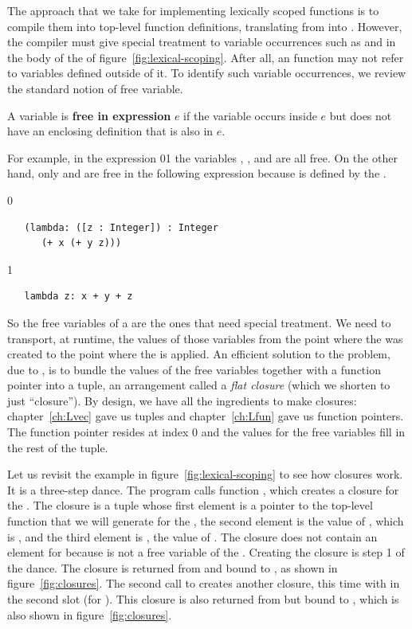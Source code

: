 \documentclass[7x10]{TimesAPriori_MIT}%
\def\racketEd{0}
\def\pythonEd{1}
\def\edition{0}
\newcommand{\racket}[1]{{\if\edition\racketEd{#1}\fi}}
\newcommand{\python}[1]{{\if\edition\pythonEd #1\fi}}
\numberwithin{theorem}{chapter}
\numberwithin{definition}{chapter}
\numberwithin{equation}{chapter}
\begin{document}
The approach that we take for implementing lexically scoped functions
is to compile them into top-level function definitions, translating
from \LangLam{} into \LangFun{}.  However, the compiler must give
special treatment to variable occurrences such as  and
 in the body of the  of
figure~\ref{fig:lexical-scoping}. After all, an \LangFun{} function
may not refer to variables defined outside of it. To identify such
variable occurrences, we review the standard notion of free variable.

\begin{definition}
A variable is \textbf{free in expression} $e$ if the variable occurs
inside $e$ but does not have an enclosing definition that is also in
$e$.
\end{definition}

For example, in the expression
\racket{}\python{}
the variables , , and  are all free.  On the other hand,
only  and  are free in the following expression
because  is defined by the .
{\if\edition\racketEd
\begin{lstlisting}
   (lambda: ([z : Integer]) : Integer
      (+ x (+ y z)))
\end{lstlisting}
\fi}
{\if\edition\pythonEd
\begin{lstlisting}
   lambda z: x + y + z
\end{lstlisting}
\fi}
%
So the free variables of a  are the ones that need
special treatment. We need to transport, at runtime, the values of
those variables from the point where the  was created to
the point where the  is applied. An efficient solution to
the problem, due to \citet{Cardelli:1983aa}, is to bundle the values
of the free variables together with a function pointer into a tuple,
an arrangement called a \emph{flat closure} (which we shorten to just
``closure'').
%
By design, we have all the ingredients to make closures:
chapter~\ref{ch:Lvec} gave us tuples and chapter~\ref{ch:Lfun} gave us
function pointers. The function pointer resides at index $0$ and the
values for the free variables fill in the rest of the tuple.

Let us revisit the example in figure~\ref{fig:lexical-scoping} to see
how closures work. It is a three-step dance. The program calls
function , which creates a closure for the . The
closure is a tuple whose first element is a pointer to the top-level
function that we will generate for the , the second
element is the value of , which is , and the third
element is , the value of . The closure does not
contain an element for  because  is not a free
variable of the . Creating the closure is step 1 of the
dance. The closure is returned from  and bound to , as
shown in figure~\ref{fig:closures}.
%
The second call to  creates another closure, this time with
 in the second slot (for ). This closure is also
returned from  but bound to , which is also shown in
figure~\ref{fig:closures}.
\end{document}
